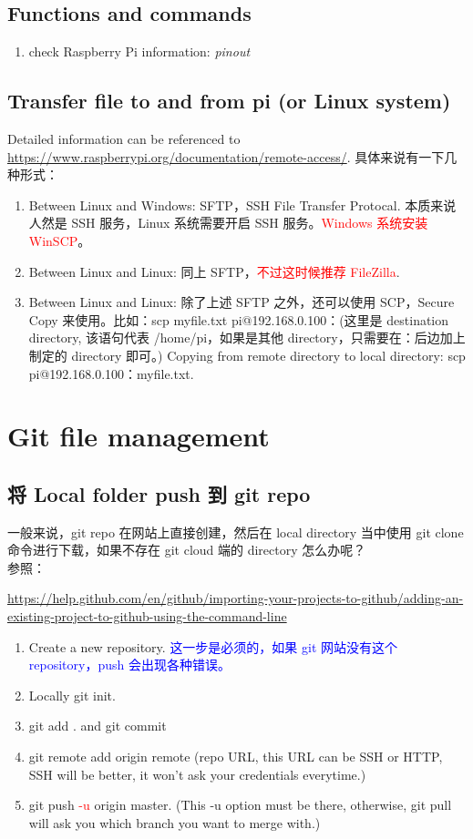 \documentclass[UTF8,fancyhdr,a4paper]{ctexart}
\begin{document}
\subsection{Functions and commands}
\begin{enumerate}
\item check Raspberry Pi information: \textit{pinout}
\end{enumerate}
\subsection{Transfer file to and from pi (or Linux system)}
Detailed information can be referenced to \url{https://www.raspberrypi.org/documentation/remote-access/}. 具体来说有一下几种形式：
\begin{enumerate}
\item Between Linux and Windows: SFTP，SSH File Transfer Protocal. 本质来说人然是 SSH 服务，Linux 系统需要开启 SSH 服务。\textcolor{red}{Windows 系统安装 WinSCP}。
\item Between Linux and Linux: 同上 SFTP，\textcolor{red}{不过这时候推荐 FileZilla}.
\item Between Linux and Linux: 除了上述 SFTP 之外，还可以使用 SCP，Secure Copy 来使用。比如：scp myfile.txt pi@192.168.0.100：(这里是 destination directory, 该语句代表 /home/pi，如果是其他 directory，只需要在：后边加上制定的 directory 即可。) Copying from remote directory to local directory: scp pi@192.168.0.100：myfile.txt. 




\end{enumerate}


\newpage
\section{Git file management}
\subsection{将 Local folder push 到 git repo}
一般来说，git repo 在网站上直接创建，然后在 local directory 当中使用 git clone 命令进行下载，如果不存在 git cloud 端的 directory 怎么办呢？\\
参照：\begin{sloppypar}\url{https://help.github.com/en/github/importing-your-projects-to-github/adding-an-existing-project-to-github-using-the-command-line}\end{sloppypar}
\begin{enumerate}
\item Create a new repository. \textcolor{blue}{这一步是必须的，如果 git 网站没有这个 repository，push 会出现各种错误。}
\item Locally git init.
\item git add . and git commit
\item git remote add origin remote (repo URL, this URL can be SSH or HTTP, SSH will be better, it won't ask your credentials everytime.)
\item git push \textcolor{red}{-u} origin master. (This -u option must be there, otherwise, git pull will ask you which branch you want to merge with.)
\end{enumerate}
\end{document}

